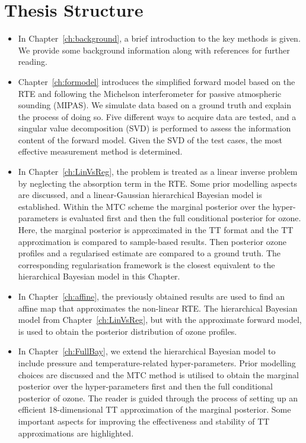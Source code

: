 \section{Thesis Structure}
\begin{itemize}
	\item In Chapter~\ref{ch:background}, a brief introduction to the key methods is given. We provide some background information along with references for further reading.
	\item Chapter~\ref{ch:formodel} introduces the simplified forward model based on the RTE and following the Michelson interferometer for passive atmospheric sounding (MIPAS).
	We simulate data based on a ground truth and explain the process of doing so.
	Five different ways to acquire data are tested, and a singular value decomposition (SVD) is performed to assess the information content of the forward model.
	Given the SVD of the test cases, the most effective measurement method is determined.
	\item In Chapter~\ref{ch:LinVsReg}, the problem is treated as a linear inverse problem by neglecting the absorption term in the RTE. Some prior modelling aspects are discussed, and a linear-Gaussian hierarchical Bayesian model is established.
	Within the MTC scheme the marginal posterior over the hyper-parameters is evaluated first and then the full conditional posterior for ozone.
	Here, the marginal posterior is approximated in the TT format and the TT approximation is compared to sample-based results.
	Then posterior ozone profiles and a regularised estimate are compared to a ground truth.
	The corresponding regularisation framework is the closest equivalent to the hierarchical Bayesian model in this Chapter.
	\item In Chapter~\ref{ch:affine}, the previously obtained results are used to find an affine map that approximates the non-linear RTE. The hierarchical Bayesian model from Chapter~\ref{ch:LinVsReg}, but with the approximate forward model, is used to obtain the posterior distribution of ozone profiles.
	\item In Chapter~\ref{ch:FullBay}, we extend the hierarchical Bayesian model to include pressure and temperature-related hyper-parameters.
	Prior modelling choices are discussed and the MTC method is utilised to obtain the marginal posterior over the hyper-parameters first and then the full conditional posterior of ozone.
	The reader is guided through the process of setting up an efficient 18-dimensional TT approximation of the marginal posterior.
	Some important aspects for improving the effectiveness and stability of TT approximations are highlighted.

\end{itemize}
